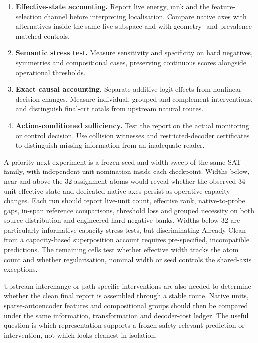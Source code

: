 \documentclass[
  british,
  11pt,
  a4paper,
]{article}
\providecommand{\tightlist}{%
  \setlength{\itemsep}{0pt}\setlength{\parskip}{0pt}}
\begin{document}
\begin{enumerate}
\def\labelenumi{\arabic{enumi}.}
\tightlist
\item
  \textbf{Effective-state accounting.} Report live energy, rank and the
  feature-selection channel before interpreting localisation. Compare
  native axes with alternatives inside the same live subspace and with
  geometry- and prevalence-matched controls.
\item
  \textbf{Semantic stress test.} Measure sensitivity and specificity on
  hard negatives, symmetries and compositional cases, preserving
  continuous scores alongside operational thresholds.
\item
  \textbf{Exact causal accounting.} Separate additive logit effects from
  nonlinear decision changes. Measure individual, grouped and complement
  interventions, and distinguish final-cut totals from upstream natural
  routes.
\item
  \textbf{Action-conditioned sufficiency.} Test the report on the actual
  monitoring or control decision. Use collision witnesses and
  restricted-decoder certificates to distinguish missing information
  from an inadequate reader.
\end{enumerate}

A priority next experiment is a frozen seed-and-width sweep of the same
SAT family, with independent unit nomination inside each checkpoint.
Widths below, near and above the 32 assignment atoms would reveal
whether the observed 34-unit effective state and dedicated native axes
persist as operative capacity changes. Each run should report live-unit
count, effective rank, native-to-probe gaps, in-span reference
comparisons, threshold loss and grouped necessity on both
source-distribution and engineered hard-negative banks. Widths below 32
are particularly informative capacity stress tests, but discriminating
Already Clean from a capacity-based superposition account requires
pre-specified, incompatible predictions. The remaining cells test
whether effective width tracks the atom count and whether
regularisation, nominal width or seed controls the shared-axis
exceptions.

Upstream interchange or path-specific interventions are also needed to
determine whether the clean final report is assembled through a stable
route. Native units, sparse-autoencoder features and compositional
groups should then be compared under the same information,
transformation and decoder-cost ledger. The useful question is which
representation supports a frozen safety-relevant prediction or
intervention, not which looks cleanest in isolation.
\end{document}
